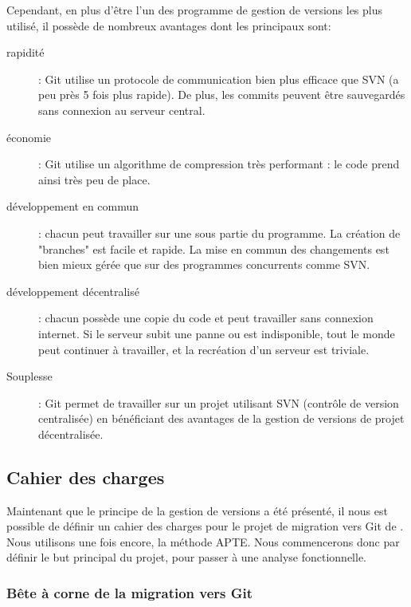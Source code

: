 Cependant, en plus d'être l'un des programme de gestion de versions les plus utilisé,
 il possède de nombreux avantages dont les principaux sont:
\begin{description}
  \item[rapidité] : Git utilise un protocole de communication bien plus efficace que SVN (a peu près 5 fois plus rapide). 
  De plus, les commits peuvent être sauvegardés sans connexion au serveur central.
  \item[économie] : Git utilise un algorithme de compression très performant : le code prend ainsi très peu de place.
  \item[développement en commun] : chacun peut travailler sur une sous partie du programme. La création de "branches" est facile et
  rapide. La mise en commun des changements est bien mieux gérée que sur des programmes concurrents comme SVN.
  \item[développement décentralisé] : chacun possède une copie du code et peut travailler sans connexion internet. 
  Si le serveur subit une panne ou est indisponible, tout le monde peut continuer à travailler, et la recréation d'un serveur est triviale.
  \item[Souplesse] : Git permet de travailler sur un projet utilisant SVN (contrôle de version centralisée)
  en bénéficiant des avantages de la gestion de versions de projet décentralisée.
\end{description}

\subsection{Cahier des charges}

Maintenant que le principe de la gestion de versions a été présenté,
il nous est possible de définir un cahier des charges
pour le projet de migration vers Git de {\gofigure}.
Nous utilisons une fois encore, la méthode {APTE\textregistered}.
Nous commencerons donc par définir le but principal du projet, pour passer à une analyse fonctionnelle.

\subsubsection*{Bête à corne de la migration vers Git}

